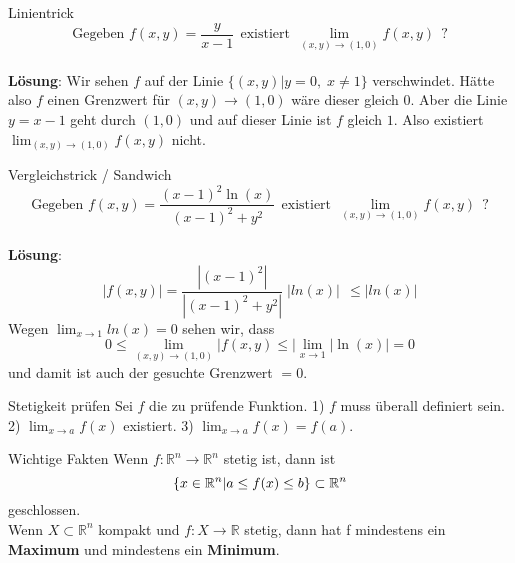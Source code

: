 \begin{Beispiel}{Linientrick}{}
\[ \text{Gegeben } f(x,y) = \frac{y}{x-1} ~~ \text{existiert} ~~ \lim_{(x,y)\rightarrow(1,0)} f(x,y) ~~ \text{?}\]
\\
\textbf{Lösung}: Wir sehen $f$ auf der Linie $\{ (x,y) | y=0, \; x \neq 1 \}$ verschwindet. Hätte also
$f$ einen Grenzwert für $(x,y) \rightarrow (1,0)$ wäre dieser gleich $0$. Aber die Linie $y=x-1$ geht
durch $(1, 0)$ und auf dieser Linie ist $f$ gleich $1$. Also existiert $\lim_{(x,y) \rightarrow (1, 0)} f(x,y)$ nicht.
\end{Beispiel}

\begin{Beispiel}{Vergleichstrick / Sandwich}{}
\[ \text{Gegeben } f(x,y) = \frac{(x-1)^2 \ln(x)}{(x-1)^2 + y^2} ~~ \text{existiert} ~~ \lim_{(x,y)\rightarrow(1,0)} f(x,y) ~~ \text{?}\]
\\
\textbf{Lösung}: 
\[ |f(x,y)| = \frac{|(x-1)^2|}{|(x-1)^2 + y^2|} \; |ln(x)| ~~ \leq |ln(x)| \]
Wegen $\lim_{x\rightarrow 1} ln(x) = 0$ sehen wir, dass 
\[ 0 \leq \lim_{(x,y) \rightarrow (1,0)} |f(x,y) \leq |\lim_{x\rightarrow 1} |\ln(x)| = 0\]
und damit ist auch der gesuchte Grenzwert $ = 0$.
\end{Beispiel}


\begin{Rezept}{Stetigkeit prüfen}{}
    Sei $f$ die zu prüfende Funktion. 1) $f$ muss überall definiert sein. 2) $\lim_{x \rightarrow a} f(x)$ existiert. 3) $\lim_{x \rightarrow a} f(x) = f(a)$.
\end{Rezept}

\begin{Diverses}{Wichtige Fakten}{}
Wenn $f: \mathbb{R}^n \rightarrow \mathbb{R}^n$ stetig ist, dann ist
\[
\{x \in \mathbb{R}^n | a \leq f(x) \leq b\} \subset \mathbb{R}^n 
\]
geschlossen. \\
Wenn  $X \subset \mathbb{R}^n$ kompakt und $f: X \rightarrow \mathbb{R}$ stetig, dann hat f mindestens ein \textbf{Maximum} und mindestens ein \textbf{Minimum}.
\end{Diverses}
